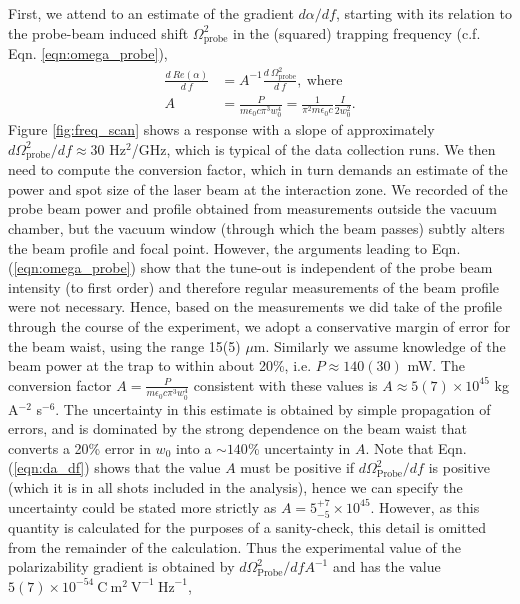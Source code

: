 	First, we attend to an estimate of the gradient $d\alpha/df$, starting with its relation to the probe-beam induced shift $\Omega_\textrm{probe}^2$ in the (squared) trapping frequency (c.f. Eqn. \ref{eqn:omega_probe}),
	\begin{align}
	\frac{d~ Re(\alpha)}{d~f}&=A^{-1}\frac{d~\Omega_{\text{probe}}^2}{d~f},~\textrm{where}\\
	    A&=\frac{P}{m \epsilon_{0} c \pi^3  w_0^4}=\frac{1}{ \pi^2 m \epsilon_{0} c }\frac{I}{2 w_0^2}.
	    \label{eqn:da_df}
	\end{align}
	Figure \ref{fig:freq_scan} shows a response with a slope of approximately $d\Omega_\textrm{probe}^2/df \approx 30$ Hz$^2$/GHz, which is typical of the data collection runs. 
	We then need to compute the conversion factor, which in turn demands an estimate of the power and spot size of the laser beam at the interaction zone.
	We recorded of the probe beam power and profile obtained from measurements outside the vacuum chamber, but the vacuum window (through which the beam passes) subtly alters the beam profile and focal point.
	However, the arguments leading to Eqn. (\ref{eqn:omega_probe}) show that the tune-out is independent of the probe beam intensity (to first order) and therefore regular measurements of the beam profile were not necessary. 
	Hence, based on the measurements we did take of the profile through the course of the experiment, we adopt a conservative margin of error for the beam waist, using the range 15(5) $\mu$m. 
	Similarly we assume knowledge of the beam power at the trap to within about 20\%, i.e. $P\approx140(30)$ mW. The conversion factor $A=\frac{P}{m \epsilon_{0} c \pi^3  w_0^4}$ consistent with these values is $A\approx5(7)\times10^{45}$ kg A$^{-2}$  s$^{-6}$. 
	The uncertainty in this estimate is obtained by simple propagation of errors, and is dominated by the strong dependence on the beam waist that converts a 20\% error in $w_0$ into a $\sim140$\% uncertainty in $A$. 
	Note that Eqn. (\ref{eqn:da_df}) shows that the value $A$ must be positive if $d\Omega_{\textrm{Probe}}^2/df$ is positive (which it is in all shots included in the analysis), hence we can specify the uncertainty could be stated more strictly as $A=5^{+7}_{-5}\times10^{45}$.
	However, as this quantity is calculated for the purposes of a sanity-check, this detail is omitted from the remainder of the calculation.
	Thus the experimental value of the polarizability gradient is obtained by $d\Omega_{\textrm{Probe}}^2/df A^{-1}$ and has the value $5(7)\times10^{-54}~\textrm{C}~\textrm{m}^2~\textrm{V}^{-1}~\textrm{Hz}^{-1}$,
